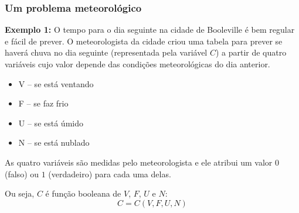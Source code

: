 \documentclass{beamer}
\begin{document}
\begin{frame}
 \frametitle{Um problema meteorológico}

\textbf{Exemplo 1:} O tempo para o dia seguinte na cidade
de Booleville é bem regular e fácil de prever. O meteorologista
da cidade criou uma tabela para prever se haverá chuva no dia
seguinte (representada pela variável $C$) a partir de quatro
variáveis cujo valor depende das condições meteorológicas do
dia anterior.

\begin{itemize}
\item V -- se está ventando
\item F -- se faz frio
\item U -- se está úmido
\item N -- se está nublado
\end{itemize}

As quatro variáveis são medidas pelo meteorologista e ele
atribui um valor $0$ (falso) ou $1$ (verdadeiro) para cada
uma delas.\\[6pt]

\pause

Ou seja, $C$ é função booleana de $V$, $F$, $U$ e $N$:
$$C = C(V,F,U,N)$$

\end{frame}

\end{document}

